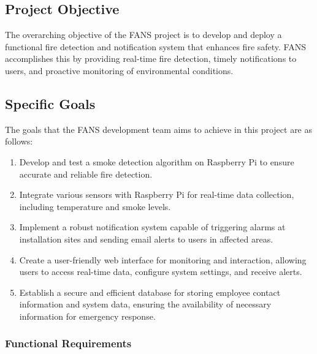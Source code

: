 \subsection{Project Objective}

The overarching objective of the FANS project is to develop and deploy a functional fire detection and notification
system that enhances fire safety. FANS accomplishes this by providing real-time fire detection, timely notifications to
users, and proactive monitoring of environmental conditions.

\subsection{Specific Goals}

The goals that the FANS development team aims to achieve in this project are as follows:

\begin{enumerate}
    \item Develop and test a smoke detection algorithm on Raspberry Pi to ensure accurate and reliable fire detection.

    \item Integrate various sensors with Raspberry Pi for real-time data collection, including temperature and smoke levels.

    \item Implement a robust notification system capable of triggering alarms at installation sites and sending email alerts to
          users in affected areas.

    \item Create a user-friendly web interface for monitoring and interaction, allowing users to access real-time data, configure
          system settings, and receive alerts.

    \item Establish a secure and efficient database for storing employee contact information and system data, ensuring the
          availability of necessary information for emergency response.
\end{enumerate}

\subsubsection{Functional Requirements}

